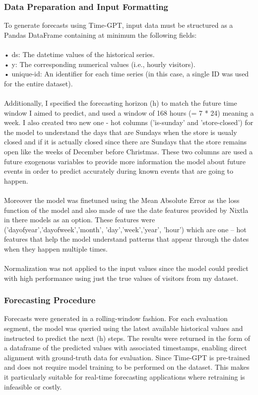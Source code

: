\documentclass{article}
\begin{document}
\subsubsection{Data Preparation and Input Formatting}
To generate forecasts using Time-GPT, input data must be structured as a Pandas DataFrame containing at minimum the following fields:\\
\\
•	ds: The datetime values of the historical series.\\
•	y: The corresponding numerical values (i.e., hourly visitors).\\
•	unique-id: An identifier for each time series (in this case, a single ID was used for the entire dataset).\\
\\
Additionally, I specified the forecasting horizon (h) to match the future time window I aimed to predict, and used a window of  168 hours (= 7 * 24)  meaning a week. I also created two new one - hot columns ('is-sunday' and 'store-closed') for the model to understand the days that are Sundays when the store is usualy closed and if it is actually closed since there are Sundays that the store remains open like the weeks of December before Christmas. These two columns are used a future exogenous variables to provide more information the model about future events in order to predict accurately during known events that are going to happen.\\
\\
Moreover the model was finetuned using the Mean Absolute Error as the loss function of the model and also made of use the date features provided by Nixtla in there models as an option. These features were ('dayofyear','dayofweek','month', 'day','week','year', 'hour') which are one – hot features that help the model understand patterns that appear through the dates when they happen multiple times.\\
\\
Normalization was not applied to the input values since the model could predict with high performance using just the true values of visitors from my dataset.\\


\subsubsection{Forecasting Procedure}
Forecasts were generated in a rolling-window fashion. For each evaluation segment, the model was queried using the latest available historical values and instructed to predict the next (h) steps. The results were returned in the form of a dataframe of the predicted values with associated timestamps, enabling direct alignment with ground-truth data for evaluation.
Since Time-GPT is pre-trained and does not require model training to be performed on the dataset. This makes it particularly suitable for real-time forecasting applications where retraining is infeasible or costly.\\
\end{document}
